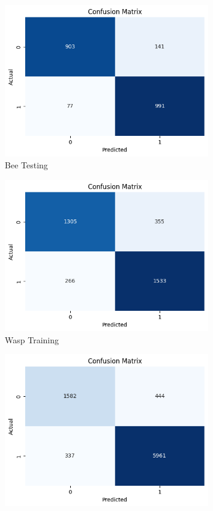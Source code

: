 \documentclass[12pt]{article}
\begin{document}
\begin{enumerate}
\begin{figure}[H]
\begin{minipage}{0.45\textwidth}
				\includegraphics[width=0.8\textwidth]{Images/Confusion/vgg bees test.png} \\ \vspace{0.25 cm}
				Bee Testing
			\end{minipage}
			\newline
			\begin{minipage}{0.45\textwidth}
				\vspace{0.5 cm}
				\centering
				\includegraphics[width=0.8\textwidth]{Images/Confusion/vgg wasps train.png}\\ \vspace{0.25 cm}
				Wasp Training
			\end{minipage}
			\hfill
			\begin{minipage}{0.45\textwidth}
				\centering
				\includegraphics[width=0.8\textwidth]{Images/Confusion/vgg wasps test.png}\\ \vspace{0.25 cm}

\end{minipage}
\end{figure}
\end{enumerate}
\end{document}

